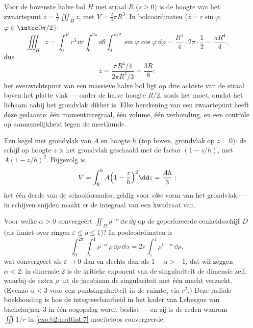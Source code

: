 \begin{example}\label{ex:b2:multint:centroid}
Voor de bovenste halve bol $H$ met straal $R$ ($z \geq 0$) is de
hoogte van het zwaartepunt $\bar z = \frac1{V}\iiint_H z$, met $V =
\frac23\pi R^3$. In bolcoördinaten ($z = r\sin\varphi$, $\varphi
\in \intcc0{\pi/2}$):
\[
\iiint_H z
= \int_0^R r^3\,\dd r\int_0^{2\pi}\dd\theta
\int_0^{\pi/2}\sin\varphi\cos\varphi\,\dd\varphi
= \frac{R^4}4\cdot2\pi\cdot\frac12 = \frac{\pi R^4}4 ,
\]
dus
\[
\bar z = \frac{\pi R^4/4}{2\pi R^3/3} = \frac{3R}8 :
\]
het evenwichtspunt van een massieve halve bol ligt op drie achtste
van de straal boven het platte vlak --- onder de halve hoogte
$R/2$, zoals het moet, omdat het lichaam nabij het grondvlak dikker
is. Elke berekening van een zwaartepunt heeft deze gedaante: één
momentintegraal, één volume, één verhouding, en een controle op
aannemelijkheid tegen de meetkunde.
\end{example}

\begin{example}\label{ex:b2:multint:cone}
Een kegel met grondvlak van  $A$ en hoogte $h$ (top
boven, grondvlak op $z = 0$): de schijf op hoogte $z$ is het
grondvlak geschaald met de factor $(1 - z/h)$, met  $A(1
- z/h)^2$. Bijgevolg is
\[
V = \int_0^h A\Bigl(1 - \frac zh\Bigr)^2\dd z = \frac{Ah}{3} :
\]
het één derde van de schoolformules, geldig voor \emph{elke} vorm
van het grondvlak --- in schijven snijden maakt er de integraal van
een kwadraat van.
\end{example}

\begin{example}\label{ex:b2:multint:threshold}
Voor welke $\alpha > 0$ convergeert $\iint_{D}\rho^{-\alpha}\,\dd
x\,\dd y$ op de geperforeerde eenheidsschijf $D$ (als limiet over
ringen $\varepsilon \leq \rho \leq 1$)? In poolcoördinaten is
\[
\int_0^{2\pi}\!\!\int_\varepsilon^1\rho^{-\alpha}\,
\rho\,\dd\rho\,\dd\alpha
= 2\pi\int_\varepsilon^1\rho^{1-\alpha}\,\dd\rho ,
\]
wat convergeert als $\varepsilon \to 0$ dan en slechts dan als $1 -
\alpha > -1$, dat wil zeggen $\alpha < 2$: in dimensie $2$ is de
kritieke exponent van de singulariteit de dimensie zelf, waarbij de
extra $\rho$ uit de jacobiaan de singulariteit met één macht
verzacht. (Evenzo $\alpha < 3$ voor een puntsingulariteit in de
ruimte, via $r^2$.) Deze radiale boekhouding is hoe de
integreerbaarheid in het kader van Lebesgue van bachelorjaar 3 in
één oogopslag wordt beslist --- en zij is de reden waarom $\iiint
1/r$ in \cref{exo:b2:multint:7} moeiteloos convergeerde.
\end{example}

